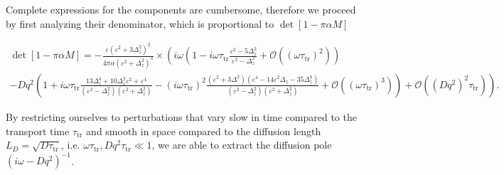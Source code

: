 Complete expressions for the components are cumbersome, therefore we proceed by first analyzing their denominator, which is proportional to $\det [1-\pi\alpha M]$

\begin{multline}
  \det [1-\pi\alpha M]=
   -\frac{\varepsilon  \left(\varepsilon ^2+3\Delta_z^2\right)^2}{4 \pi  \alpha  \left(\varepsilon ^2+\Delta_z^2\right)^3}\times\left(i\omega\left(1-i\omega\tau_\text{tr}\frac{\varepsilon^2-5\Delta_z^2}{\varepsilon^2-\Delta_z^2}+\mathcal{O}((\omega\tau_\text{tr})^2)\right)\right.%
   \\
   \left.-Dq^2\left(1+i\omega\tau_\text{tr}\frac{13\Delta_z^4+10\Delta_z^2\varepsilon^2+\varepsilon^4}{(\varepsilon^2-\Delta_z^2)(\varepsilon^2+\Delta_z^2)}-(i\omega\tau_\text{tr})^2\frac{(\varepsilon^2+3\Delta^2)(\varepsilon^4-14\varepsilon^2\Delta_z-35\Delta_z^4)}{(\varepsilon^2-\Delta_z^2)(\varepsilon^2+\Delta_z^2)}+\mathcal{O}((\omega\tau_\text{tr})^3)\right)+\mathcal{O}((Dq^2)^2\tau_\text{tr})\right).
\label{chap1:eq:sdet}
\end{multline}

By restricting ourselves to perturbations that vary slow in time compared to the transport time $\tau_\text{tr}$ and smooth in space compared to the diffusion length $L_D=\sqrt{D\tau_\text{tr}}$, i.e. $\omega\tau_\text{tr},Dq^2\tau_\text{tr}\ll1$, we are able to extract the diffusion pole $(i\omega-Dq^2)^{-1}$.

